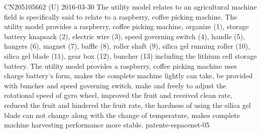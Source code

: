{CN205105662 (U)}%
{2016-03-30}%
{The utility model relates to an agricultural machine field is specifically said
  to relate to a raspberry, coffee picking machine. The utility model provides a
  raspberry, coffee picking machine, organize (1), storage battery knapsack (2),
  electric wire (3), speed governing switch (4), handle (5), hangers (6), magnet
  (7), baffle (8), roller shaft (9), silica gel running roller (10), silica gel
  blade (11), gear box (12), buncher (13) including the lithium cell storage
  battery. The utility model provides a raspberry, coffee picking machine uses
  charge battery's form, makes the complete machine lightly can take, be
  provided with buncher and speed governing switch, make and freely to adjust
  the rotational speed of gyro wheel, improved the fruit and received clean
  rate, reduced the fruit and hindered the fruit rate, the hardness of using the
  silica gel blade can not change along with the change of temperature, makes
  complete machine harvesting performance more stable.}%
{patente-espacenet-05}%



